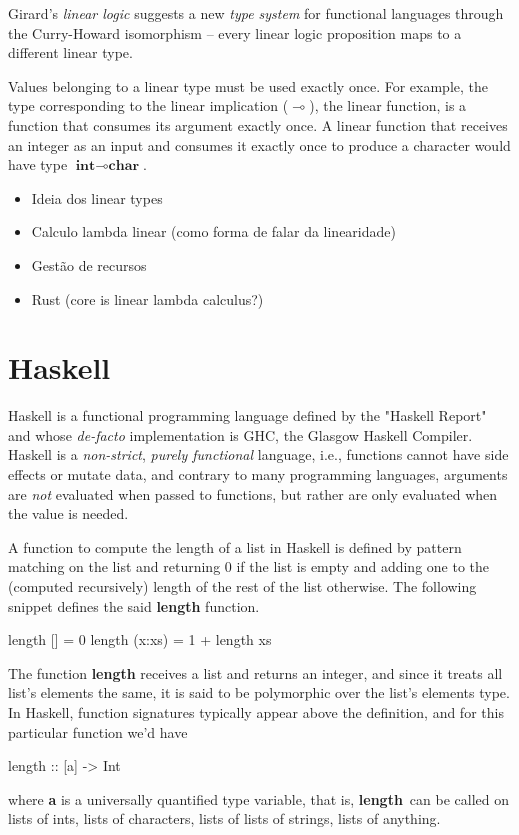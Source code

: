 \documentclass[a4paper, draft]{report}
\newcommand{\lolli}{\multimap}
\begin{document}
Girard's \emph{linear logic} suggests a new \emph{type system} for functional
languages through the Curry-Howard isomorphism -- every linear logic proposition
maps to a different linear type.

Values belonging to a linear type must be used exactly once. For example, the
type corresponding to the linear implication ($\lolli$), the linear function, is
a function that consumes its argument exactly once. A linear function that
receives an integer as an input and consumes it exactly once to
produce a character would have type $\textbf{int} \lolli
\textbf{char}$.


\begin{itemize}
    \item Ideia dos linear types
    \item Calculo lambda linear (como forma de falar da linearidade)
    \item Gestão de recursos
    \item Rust (core is linear lambda calculus?)
\end{itemize}


\section{Haskell}

Haskell is a functional programming language defined by the "Haskell
Report"\cite{jones1999haskell,marlow2010haskell} and whose \emph{de-facto}
implementation is GHC, the Glasgow Haskell Compiler\cite{GHC}. Haskell is a
\emph{non-strict}, \emph{purely functional} language, i.e., functions cannot
have side effects or mutate data, and contrary to many programming languages,
arguments are \emph{not} evaluated when passed to functions, but rather are only
evaluated when the value is needed.

A function to compute the length of a list in Haskell is defined by pattern
matching on the list and returning $0$ if the list is empty and adding one to
the (computed recursively) length of the rest of the list otherwise. The
following snippet defines the said \textbf{length} function.
\begin{code}
    length [] = 0
    length (x:xs) = 1 + length xs
\end{code}
The function \textbf{length} receives a list and returns an integer, and since
it treats all list's elements the same, it is said to be polymorphic over the
list's elements type. In Haskell, function signatures typically appear above the
definition, and for this particular function we'd have
\begin{code}
    length :: [a] -> Int
\end{code}
where \textbf{a} is a universally quantified type variable, that is,
\textbf{length} can be called on lists of ints, lists of characters, lists of
lists of strings, lists of anything.
\end{document}
